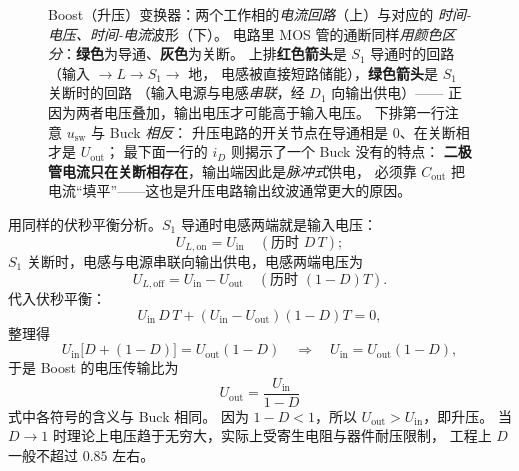 \documentclass[cn,blue,11pt,device=normal]{elegantnote}
\begin{document}
\begin{figure}[htbp]
  \caption{Boost（升压）变换器：两个工作相的\emph{电流回路}（上）与对应的
  \emph{时间-电压、时间-电流}波形（下）。
  电路里 MOS 管的通断同样\emph{用颜色区分}：\textbf{绿色}为导通、\textbf{灰色}为关断。
  上排\textbf{红色箭头}是 $S_1$ 导通时的回路（输入 $\to L\to S_1\to$ 地，
  电感被直接短路储能），\textbf{绿色箭头}是 $S_1$ 关断时的回路
  （输入电源与电感\emph{串联}，经 $D_1$ 向输出供电）——
  正因为两者电压叠加，输出电压才可能高于输入电压。
  下排第一行注意 $u_{\mathrm{sw}}$ 与 Buck \emph{相反}：
  升压电路的开关节点在导通相是 $0$、在关断相才是 $U_{\mathrm{out}}$；
  最下面一行的 $i_D$ 则揭示了一个 Buck 没有的特点：
  \textbf{二极管电流只在关断相存在}，输出端因此是\emph{脉冲式}供电，
  必须靠 $C_{\mathrm{out}}$ 把电流“填平”——这也是升压电路输出纹波通常更大的原因。}
  \label{fig:boost}
\end{figure}

用同样的伏秒平衡分析。$S_1$ 导通时电感两端就是输入电压：
\begin{equation}
  U_{L,\mathrm{on}} = U_{\mathrm{in}} \quad(\text{历时 }D\,T);
\end{equation}
$S_1$ 关断时，电感与电源串联向输出供电，电感两端电压为
\begin{equation}
  U_{L,\mathrm{off}} = U_{\mathrm{in}} - U_{\mathrm{out}} \quad(\text{历时 }(1-D)T).
\end{equation}
代入伏秒平衡：
\begin{equation}
  U_{\mathrm{in}}\,D\,T + (U_{\mathrm{in}}-U_{\mathrm{out}})(1-D)T = 0 ,
\end{equation}
整理得
\begin{equation}
  U_{\mathrm{in}}\bigl[D+(1-D)\bigr] = U_{\mathrm{out}}(1-D)
  \quad\Longrightarrow\quad
  U_{\mathrm{in}} = U_{\mathrm{out}}(1-D),
\end{equation}
于是 Boost 的电压传输比为
\begin{equation}\label{eq:boostgain}
  \boxed{\;U_{\mathrm{out}} = \frac{U_{\mathrm{in}}}{1-D}\;}
\end{equation}
式中各符号的含义与 Buck 相同。
因为 $1-D<1$，所以 $U_{\mathrm{out}}>U_{\mathrm{in}}$，即升压。
当 $D\to1$ 时理论上电压趋于无穷大，实际上受寄生电阻与器件耐压限制，
工程上 $D$ 一般不超过 $0.85$ 左右。
\end{document}
